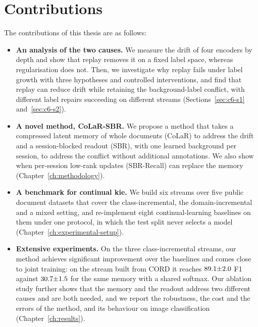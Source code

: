 \section{Contributions}
\label{sec:c1-s4}

The contributions of this thesis are as follows:

\begin{itemize}
  \item \textbf{An analysis of the two causes.} We measure the drift of four
        encoders by depth and show that replay removes it on a fixed label space, whereas
        regularisation does not. Then, we investigate why replay fails under label growth
        with three hypotheses and controlled interventions, and find that replay can
        reduce drift while retaining the background-label conflict, with different label
        repairs succeeding on different streams (Sections~\ref{sec:c6-s1}
        and~\ref{sec:c6-s2}).
  \item \textbf{A novel method, CoLaR-SBR.} We propose a method that takes a compressed
        latent memory of whole documents (CoLaR) to address the drift and a
        session-blocked readout (SBR), with one learned background per session, to address
        the conflict without additional annotations. We also show when per-session
        low-rank updates (SBR-Recall) can replace the memory
        (Chapter~\ref{ch:methodology}).
  \item \textbf{A benchmark for continual \gls{kie}.} We build six streams over five
        public document datasets that cover the class-incremental, the domain-incremental
        and a mixed setting, and re-implement eight continual-learning baselines on them
        under one protocol, in which the test split never selects a model
        (Chapter~\ref{ch:experimental-setup}).
  \item \textbf{Extensive experiments.} On the three class-incremental streams, our method
        achieves significant improvement over the baselines and comes close to joint
        training: on the stream built from CORD it reaches $89.1{\pm}2.0$ F1 against
        $30.7{\pm}1.5$ for the same memory with a shared softmax. Our ablation study
        further shows that the memory and the readout address two different causes and are
        both needed, and we report the robustness, the cost and the errors of the method,
        and its behaviour on image classification (Chapter~\ref{ch:results}).
\end{itemize}

